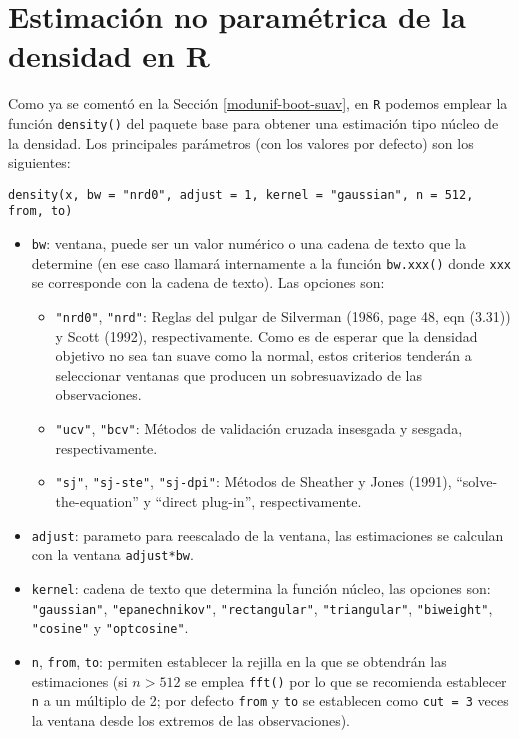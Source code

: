 \documentclass[
]{book}
\theoremstyle{break}
\theoremstyle{definition}
\theoremstyle{definition}
\theoremstyle{definition}
\theoremstyle{definition}
\theoremstyle{remark}
\begin{document}
\hypertarget{npden-r}{%
\section{Estimación no paramétrica de la densidad en R}\label{npden-r}}

Como ya se comentó en la Sección \ref{modunif-boot-suav},
en \texttt{R} podemos emplear la función \texttt{density()} del paquete base para obtener
una estimación tipo núcleo de la densidad.
Los principales parámetros (con los valores por defecto) son los siguientes:

\begin{verbatim}
density(x, bw = "nrd0", adjust = 1, kernel = "gaussian", n = 512, from, to)
\end{verbatim}

\begin{itemize}
\item
  \texttt{bw}: ventana, puede ser un valor numérico o una cadena de texto que la determine
  (en ese caso llamará internamente a la función \texttt{bw.xxx()} donde \texttt{xxx} se corresponde
  con la cadena de texto). Las opciones son:

  \begin{itemize}
  \item
    \texttt{"nrd0"}, \texttt{"nrd"}: Reglas del pulgar de Silverman (1986, page 48, eqn (3.31)) y
    Scott (1992), respectivamente. Como es de esperar que la densidad objetivo
    no sea tan suave como la normal, estos criterios tenderán a seleccionar
    ventanas que producen un sobresuavizado de las observaciones.
  \item
    \texttt{"ucv"}, \texttt{"bcv"}: Métodos de validación cruzada insesgada y sesgada, respectivamente.
  \item
    \texttt{"sj"}, \texttt{"sj-ste"}, \texttt{"sj-dpi"}: Métodos de Sheather y Jones (1991),
    ``solve-the-equation'' y ``direct plug-in'', respectivamente.
  \end{itemize}
\item
  \texttt{adjust}: parameto para reescalado de la ventana, las estimaciones se calculan
  con la ventana \texttt{adjust*bw}.
\item
  \texttt{kernel}: cadena de texto que determina la función núcleo, las opciones son: \texttt{"gaussian"},
  \texttt{"epanechnikov"}, \texttt{"rectangular"}, \texttt{"triangular"}, \texttt{"biweight"}, \texttt{"cosine"} y \texttt{"optcosine"}.
\item
  \texttt{n}, \texttt{from}, \texttt{to}: permiten establecer la rejilla en la que se obtendrán las estimaciones
  (si \(n>512\) se emplea \texttt{fft()} por lo que se recomienda establecer \texttt{n} a un múltiplo de 2;
  por defecto \texttt{from} y \texttt{to} se establecen como \texttt{cut\ =\ 3} veces la ventana desde los extremos
  de las observaciones).
\end{itemize}
\end{document}
